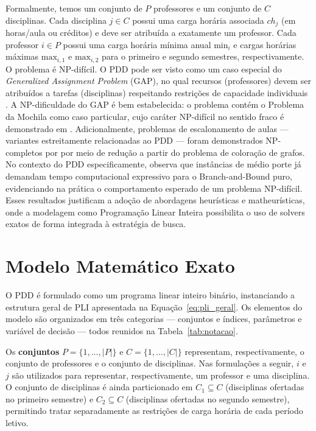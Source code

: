 Formalmente, temos um conjunto de $P$ professores e um conjunto de $C$ disciplinas. Cada disciplina $j\in C$ possui uma carga horária associada $ch_j$ (em horas/aula ou créditos) e deve ser atribuída a exatamente um professor. Cada professor $i\in P$ possui uma carga horária mínima anual $\text{min}_i$ e cargas horárias máximas $\text{max}_{i,1}$ e $\text{max}_{i,2}$ para o primeiro e segundo semestres, respectivamente. O problema é NP-difícil. O PDD pode ser visto como um caso especial do \textit{Generalized Assignment Problem} (GAP), no qual recursos (professores) devem ser atribuídos a tarefas (disciplinas) respeitando restrições de capacidade individuais \cite{garey_johnson_1979}. A NP-dificuldade do GAP é bem estabelecida: o problema contém o Problema da Mochila como caso particular, cujo caráter NP-difícil no sentido fraco é demonstrado em . Adicionalmente, problemas de escalonamento de aulas --- variantes estreitamente relacionadas ao PDD --- foram demonstrados NP-completos por  por meio de redução a partir do problema de coloração de grafos. No contexto do PDD especificamente,  observa que instâncias de médio porte já demandam tempo computacional expressivo para o Branch-and-Bound puro, evidenciando na prática o comportamento esperado de um problema NP-difícil. Esses resultados justificam a adoção de abordagens heurísticas e matheurísticas, onde a modelagem como Programação Linear Inteira possibilita o uso de solvers exatos de forma integrada à estratégia de busca.

\section{Modelo Matemático Exato}

O PDD é formulado como um programa linear inteiro binário, instanciando a estrutura geral de PLI apresentada na Equação~\eqref{eq:pli_geral}. Os elementos do modelo são organizados em três categorias --- conjuntos e índices, parâmetros e variável de decisão --- todos reunidos na Tabela~\ref{tab:notacao}.

Os \textbf{conjuntos} $P = \{1,\ldots,|P|\}$ e $C = \{1,\ldots,|C|\}$ representam, respectivamente, o conjunto de professores e o conjunto de disciplinas. Nas formulações a seguir, $i$ e $j$ são utilizados para representar, respectivamente, um professor e uma disciplina. O conjunto de disciplinas é ainda particionado em $C_1 \subseteq C$ (disciplinas ofertadas no primeiro semestre) e $C_2 \subseteq C$ (disciplinas ofertadas no segundo semestre), permitindo tratar separadamente as restrições de carga horária de cada período letivo.

